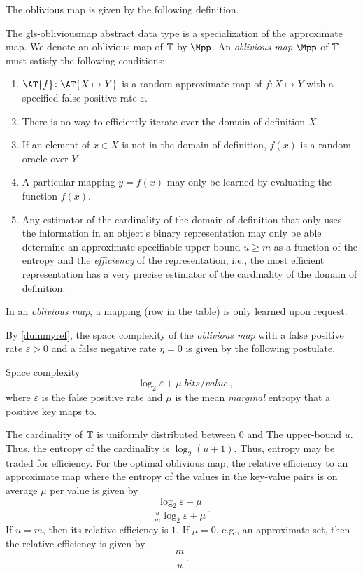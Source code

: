 \documentclass[ ../main.tex]{subfiles}
\begin{document}
The oblivious map is given by the following definition.
\begin{definition}
The \gls{gls-obliviousmap} abstract data type is a specialization of the approximate map. We denote an oblivious map of $\mathbb{T}$ by $\Mpp$. An \emph{oblivious map} $\Mpp$ of $\mathbb{T}$ must satisfy the following conditions:
\begin{enumerate}
    \item $\AT{f} \colon \AT{X \mapsto Y}$ is a random approximate map of $f \colon X \mapsto Y$ with a specified false positive rate $\varepsilon$.
    \item There is no way to efficiently iterate over the domain of definition $X$.
    \item If an element of $x \in X$ is not in the domain of definition, $f(x)$ is a random oracle over $Y$
    \item A particular mapping $y = f(x)$ may only be learned by evaluating the function $f(x)$.
    \item Any estimator of the cardinality of the domain of definition that only uses the information in an object's binary representation may only be able determine an approximate specifiable upper-bound $u \geq m$ as a function of the entropy and the \emph{efficiency} of the representation, i.e., the most efficient representation has a very precise estimator of the cardinality of the domain of definition.
\end{enumerate}
\end{definition}
In an \emph{oblivious map}, a mapping (row in the table) is only learned upon request.

By \cref{dummyref}, the space complexity of the \emph{oblivious map} with a false positive rate $\varepsilon > 0$ and a false negative rate $\eta = 0$ is given by the following postulate.
\begin{postulate}
Space complexity
\begin{equation}
    -\log_2 \varepsilon + \mu \; \si{bits \per value}\,,
\end{equation}
where $\varepsilon$ is the false positive rate and $\mu$ is the mean \emph{marginal} entropy that a positive key maps to.
\end{postulate}

The cardinality of $\mathbb{T}$ is uniformly distributed between $0$ and The upper-bound $u$. Thus, the entropy of the cardinality is $\log_2(u+1)$. Thus, entropy may be traded for efficiency. For the optimal oblivious map, the relative efficiency to an approximate map where the entropy of the values in the key-value pairs is on average $\mu$ per value is given by
\begin{equation}
    \frac{\log_2 \varepsilon + \mu}{\frac{u}{m}\log_2 \varepsilon + \mu}\,.
\end{equation}
If $u = m$, then its relative efficiency is $1$. If $\mu = 0$, e.g., an approximate set, then the relative efficiency is given by
\begin{equation}
    \frac{m}{u}\,.
\end{equation}
\end{document}
